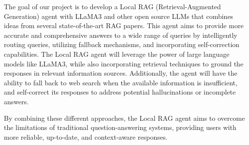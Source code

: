 The goal of our project is to develop a Local RAG (Retrieval-Augmented Generation) agent with LLaMA3 and other open source LLMs that combines ideas from several state-of-the-art RAG papers. This agent aims to provide more accurate and comprehensive answers to a wide range of queries by intelligently routing queries, utilizing fallback mechanisms, and incorporating self-correction capabilities. The Local RAG agent will leverage the power of large language models like LLaMA3, while also incorporating retrieval techniques to ground the responses in relevant information sources. Additionally, the agent will have the ability to fall back to web search when the available information is insufficient, and self-correct its responses to address potential hallucinations or incomplete answers.

By combining these different approaches, the Local RAG agent aims to overcome the limitations of traditional question-answering systems, providing users with more reliable, up-to-date, and context-aware responses.